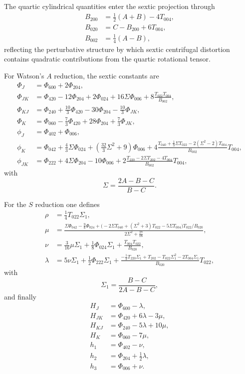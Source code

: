 The quartic cylindrical quantities enter the sextic projection through
\begin{align}
B_{200} &= \frac{1}{2}(A+B)-4T_{004},\\
B_{020} &= C-B_{200}+6T_{004},\\
B_{002} &= \frac{1}{4}(A-B),
\label{eq:sextic_B_quantities}
\end{align}
reflecting the perturbative structure by which sextic centrifugal distortion
contains quadratic contributions from the quartic rotational tensor.

For Watson's $A$ reduction, the sextic constants are
\begin{align}
\Phi_J &= \Phi_{600}+2\Phi_{204},\\
\Phi_{JK} &= \Phi_{420}-12\Phi_{204}+2\Phi_{024}
+16\Sigma\Phi_{006}
+8\frac{T_{022}T_{004}}{B_{002}},\\
\Phi_{KJ} &= \Phi_{240}+\frac{10}{3}\Phi_{420}
-30\Phi_{204}-\frac{10}{3}\Phi_{JK},\\
\Phi_K &= \Phi_{060}-\frac{7}{3}\Phi_{420}
+28\Phi_{204}+\frac{7}{3}\Phi_{JK},\\
\phi_J &= \Phi_{402}+\Phi_{006},\\
\phi_K &= \Phi_{042}+\frac{4}{3}\Sigma\Phi_{024}
+\left(\frac{32}{3}\Sigma^2+9\right)\Phi_{006}
+4\frac{T_{040}+\frac{1}{3}\Sigma T_{022}
-2(\Sigma^2-2)T_{004}}{B_{002}}T_{004},\\
\phi_{JK} &= \Phi_{222}+4\Sigma\Phi_{204}-10\Phi_{006}
+2\frac{T_{220}-2\Sigma T_{202}-4T_{004}}{B_{002}}T_{004},
\label{eq:sextic_A_projection}
\end{align}
with
\begin{equation}
\Sigma=\frac{2A-B-C}{B-C}.
\end{equation}

For the $S$ reduction one defines
\begin{align}
\rho &= \frac{1}{4}T_{022}\Sigma_1,\\
\mu &= \frac{\Sigma\Phi_{042}-\frac{9}{8}\Phi_{024}
+\bigl(-2\Sigma T_{040}+(\Sigma^2+3)T_{022}-5\Sigma T_{004}\bigr)
T_{022}/B_{020}}
{2\Sigma^2+\frac{27}{16}},\\
\nu &= \frac{3}{16}\mu\Sigma_1+\frac{1}{8}\Phi_{024}\Sigma_1
+\frac{T_{004}T_{022}}{B_{020}},\\
\lambda &= 5\nu\Sigma_1+\frac{1}{2}\Phi_{222}\Sigma_1
+\frac{-\frac{1}{2}T_{220}\Sigma_1+T_{202}-T_{022}\Sigma_1^2
-2T_{004}\Sigma_1}{B_{020}}T_{022},
\label{eq:sextic_auxiliary}
\end{align}
with
\begin{equation}
\Sigma_1=\frac{B-C}{2A-B-C},
\end{equation}
and finally
\begin{align}
H_J &= \Phi_{600}-\lambda,\\
H_{JK} &= \Phi_{420}+6\lambda-3\mu,\\
H_{KJ} &= \Phi_{240}-5\lambda+10\mu,\\
H_K &= \Phi_{060}-7\mu,\\
h_1 &= \Phi_{402}-\nu,\\
h_2 &= \Phi_{204}+\frac{1}{2}\lambda,\\
h_3 &= \Phi_{006}+\nu.
\label{eq:sextic_S_projection}
\end{align}

